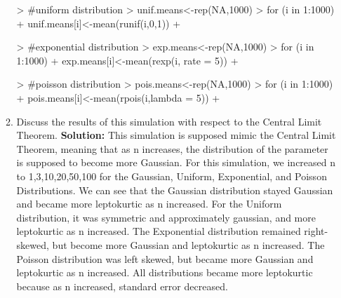 \documentclass{article}
\begin{document}
\begin{enumerate}
\begin{enumerate}
\begin{Schunk}
\begin{Sinput}
> #uniform distribution
> unif.means<-rep(NA,1000)
> for (i in 1:1000){
+   unif.means[i]<-mean(runif(i,0,1))
+ }
\end{Sinput}
\end{Schunk}

\begin{Schunk}
\begin{Sinput}
> #exponential distribution
> exp.means<-rep(NA,1000)
> for (i in 1:1000){
+   exp.means[i]<-mean(rexp(i, rate = 5))
+ }
\end{Sinput}
\end{Schunk}

\begin{Schunk}
\begin{Sinput}
> #poisson distribution
> pois.means<-rep(NA,1000)
> for (i in 1:1000){
+   pois.means[i]<-mean(rpois(i,lambda = 5))
+ }
\end{Sinput}
\end{Schunk}
  \item Discuss the results of this simulation with respect to the Central Limit Theorem.
  \newline
  \newline
  \textbf{Solution:}
  \newline
  This simulation is supposed mimic the Central Limit Theorem, meaning that as n increases, the distribution of the parameter is supposed to become more Gaussian. For this simulation, we increased n to 1,3,10,20,50,100 for the Gaussian, Uniform, Exponential, and Poisson Distributions. We can see that the Gaussian distribution stayed Gaussian and became more leptokurtic as n increased. For the Uniform distribution, it was symmetric and approximately gaussian, and more leptokurtic as n increased. The Exponential distribution remained right-skewed, but become more Gaussian and leptokurtic as n increased. The Poisson distribution was left skewed, but became more Gaussian and leptokurtic as n increased. All distributions became more leptokurtic because as n increased, standard error decreased. 
  \end{enumerate}
\newpage

\end{enumerate}
\end{document}
